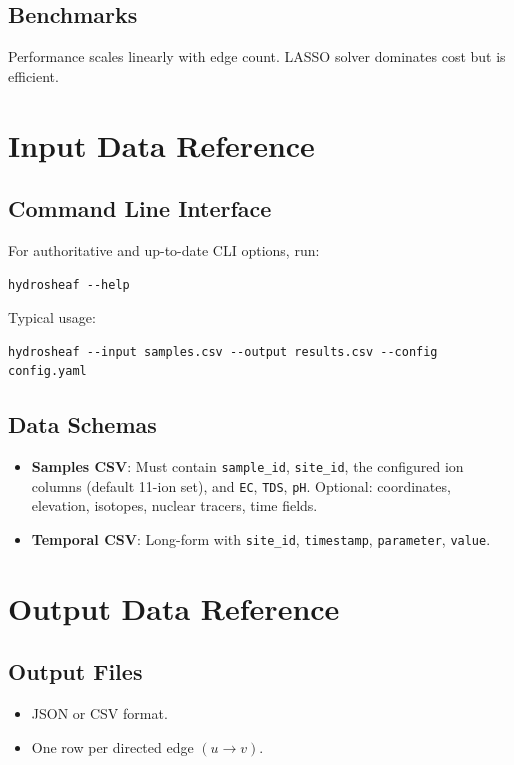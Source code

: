 \documentclass[12pt,a4paper]{article}
\theoremstyle{plain}
\theoremstyle{definition}
\theoremstyle{remark}
\begin{document}
\subsection{Benchmarks}\label{sec:benchmarks}
Performance scales linearly with edge count. LASSO solver dominates cost but is efficient.

\newpage

\section{Input Data Reference}\label{sec:input_data}

\subsection{Command Line Interface}\label{sec:cli}
For authoritative and up-to-date CLI options, run:
\begin{verbatim}
hydrosheaf --help
\end{verbatim}
Typical usage:
\begin{verbatim}
hydrosheaf --input samples.csv --output results.csv --config config.yaml
\end{verbatim}

\subsection{Data Schemas}\label{sec:schemas}
\begin{itemize}
	\item \textbf{Samples CSV}: Must contain \texttt{sample\_id}, \texttt{site\_id}, the configured ion columns (default 11-ion set), and \texttt{EC}, \texttt{TDS}, \texttt{pH}. Optional: coordinates, elevation, isotopes, nuclear tracers, time fields.
	\item \textbf{Temporal CSV}: Long-form with \texttt{site\_id}, \texttt{timestamp}, \texttt{parameter}, \texttt{value}.
\end{itemize}

\newpage

\section{Output Data Reference}\label{sec:output_data}

\subsection{Output Files}\label{sec:output_files}
\begin{itemize}
	\item JSON or CSV format.
	\item One row per directed edge $(u \to v)$.
\end{itemize}
\end{document}
